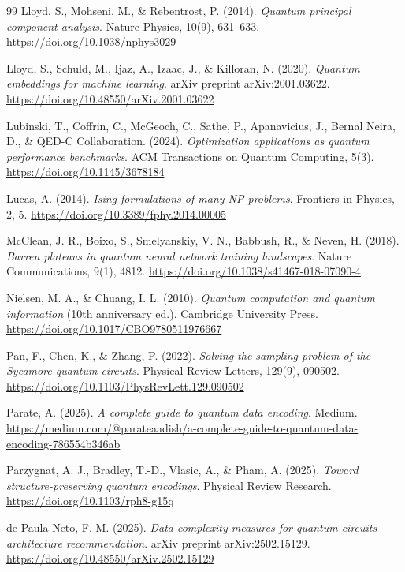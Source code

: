 \begin{thebibliography}{99}
	Lloyd, S., Mohseni, M., \& Rebentrost, P. (2014).
	\emph{Quantum principal component analysis}.
	Nature Physics, 10(9), 631--633.
	\url{https://doi.org/10.1038/nphys3029}

	Lloyd, S., Schuld, M., Ijaz, A., Izaac, J., \& Killoran, N. (2020).
	\emph{Quantum embeddings for machine learning}.
	arXiv preprint arXiv:2001.03622.
	\url{https://doi.org/10.48550/arXiv.2001.03622}

	Lubinski, T., Coffrin, C., McGeoch, C., Sathe, P., Apanavicius, J., Bernal Neira, D., \& QED-C Collaboration. (2024).
	\emph{Optimization applications as quantum performance benchmarks}.
	ACM Transactions on Quantum Computing, 5(3).
	\url{https://doi.org/10.1145/3678184}

	Lucas, A. (2014).
	\emph{Ising formulations of many NP problems}.
	Frontiers in Physics, 2, 5.
	\url{https://doi.org/10.3389/fphy.2014.00005}

	McClean, J. R., Boixo, S., Smelyanskiy, V. N., Babbush, R., \& Neven, H. (2018).
	\emph{Barren plateaus in quantum neural network training landscapes}.
	Nature Communications, 9(1), 4812.
	\url{https://doi.org/10.1038/s41467-018-07090-4}

	Nielsen, M. A., \& Chuang, I. L. (2010).
	\emph{Quantum computation and quantum information} (10th anniversary ed.).
	Cambridge University Press.
	\url{https://doi.org/10.1017/CBO9780511976667}

	Pan, F., Chen, K., \& Zhang, P. (2022).
	\emph{Solving the sampling problem of the Sycamore quantum circuits}.
	Physical Review Letters, 129(9), 090502.
	\url{https://doi.org/10.1103/PhysRevLett.129.090502}

	Parate, A. (2025).
	\emph{A complete guide to quantum data encoding}.
	Medium.
	\url{https://medium.com/@parateaadish/a-complete-guide-to-quantum-data-encoding-786554b346ab}

	Parzygnat, A. J., Bradley, T.-D., Vlasic, A., \& Pham, A. (2025).
	\emph{Toward structure-preserving quantum encodings}.
	Physical Review Research.
	\url{https://doi.org/10.1103/rph8-g15q}

	de Paula Neto, F. M. (2025).
	\emph{Data complexity measures for quantum circuits architecture recommendation}.
	arXiv preprint arXiv:2502.15129.
	\url{https://doi.org/10.48550/arXiv.2502.15129}


\end{thebibliography}
